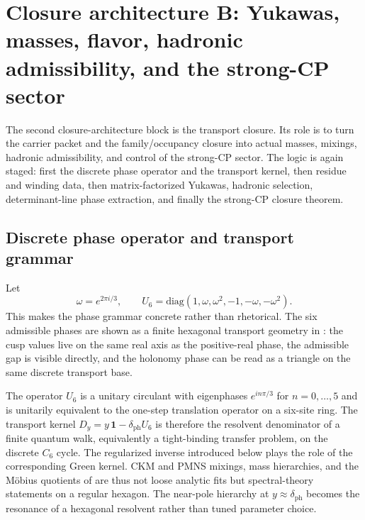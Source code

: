 \section{Closure architecture B: Yukawas, masses, flavor, hadronic admissibility, and the strong-CP sector}

The second closure-architecture block is the transport closure. Its role is to turn the carrier
packet and the family/occupancy closure into actual masses, mixings, hadronic admissibility, and
control of the strong-CP sector. The logic is again staged: first the discrete phase operator and
the transport kernel, then residue and winding data, then matrix-factorized Yukawas, hadronic
selection, determinant-line phase extraction, and finally the strong-CP closure theorem.

\subsection{Discrete phase operator and transport grammar}

Let
\[
\omega=e^{2\pi i/3},
\qquad
U_6=\mathrm{diag}(1,\omega,\omega^2,-1,-\omega,-\omega^2).
\]
This makes the phase grammar concrete rather than rhetorical. The six admissible phases are shown as a finite hexagonal transport geometry in : the cusp values live on the same real axis as the positive-real phase, the admissible gap is visible directly, and the holonomy phase can be read as a triangle on the same discrete transport base.

\begin{remark}
The operator $U_6$ is a unitary circulant with eigenphases $e^{in\pi/3}$ for $n=0,\dots,5$ and is unitarily equivalent to the one-step translation operator on a six-site ring. The transport kernel $D_y=y\,\mathbf 1-\delta_{\mathrm{ph}}U_6$ is therefore the resolvent denominator of a finite quantum walk, equivalently a tight-binding transfer problem, on the discrete $C_6$ cycle. The regularized inverse introduced below plays the role of the corresponding Green kernel. CKM and PMNS mixings, mass hierarchies, and the Möbius quotients of  are thus not loose analytic fits but spectral-theory statements on a regular hexagon. The near-pole hierarchy at $y\approx\delta_{\mathrm{ph}}$ becomes the resonance of a hexagonal resolvent rather than tuned parameter choice.
\end{remark}

